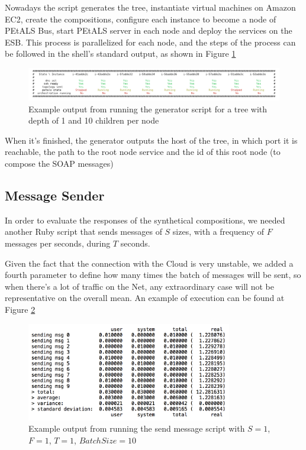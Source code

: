 Nowadays the script generates the tree, instantiate virtual machines on Amazon EC2, create the compositions, configure each instance to become a node of PEtALS Bus, start PEtALS server in each node and deploy the services on the ESB. This process is parallelized for each node, and the steps of the process can be followed in the shell's standard output, as shown in Figure \ref{generation-output}


\begin{figure}[htb]
	\centering
	\includegraphics[trim= 10mm 0mm 10mm 0mm, clip, width=\textwidth]{images/generation-output}
	\caption{Example output from running the generator script for a tree with depth of 1 and 10 children per node}
	\label{generation-output}
\end{figure}

When it's finished, the generator outputs the host of the tree, in which port it is reachable, the path to the root node service and the id of this root node (to compose the SOAP messages)

\subsection{Message Sender}

In order to evaluate the responses of the synthetical compositions, we needed another Ruby script that sends messages of $S$ sizes, with a frequency of $F$ messages per seconds, during $T$ seconds.

Given the fact that the connection with the Cloud is very unstable, we added a fourth parameter to define how many times the batch of messages will be sent, so when there's a lot of traffic on the Net, any extraordinary case will not be representative on the overall mean. An example of execution can be found at Figure \ref{send-msg-output}


\begin{figure}[htb]
	\centering
	\includegraphics[width=0.8\textwidth]{images/send-msg-output}
	\caption{Example output from running the send message script with $S = 1$, $F = 1$, $T = 1$, $BatchSize = 10$}
	\label{send-msg-output}
\end{figure}
